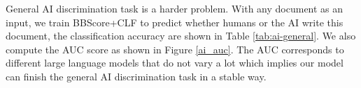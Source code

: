 \documentclass[letterpaper]{article}
\begin{document}
General AI discrimination task is a harder problem. With any document as an input, we train BBScore+CLF to predict whether humans or the AI write this document, the classification accuracy are shown in Table \ref{tab:ai-general}. We also compute the AUC score as shown in Figure \ref{ai_auc}. The AUC corresponds to different large language models that do not vary a lot which implies our model can finish the general AI discrimination task in a stable way.

\begin{table}[t!]
\centering
\small
{}
\caption{AI Generated Text Differentiation Results on WikiSection. $\clubsuit$: GPT2XL $\spadesuit$: GPT-NeoX $\vardiamondsuit$: LLaMA-7B $\varheartsuit$: LLaMA-13B $\diamondsuit$: LLaMA2-7B $\heartsuit$: LLaMA2-13B}
\label{tab:ai_diff}
\end{table}
\end{document}
